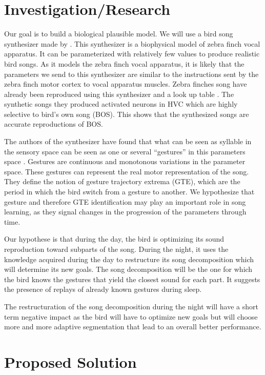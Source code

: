 \documentclass[a4paper]{article}
\begin{document}
\begin{multicols}{2}
\section*{Investigation/Research}

Our goal is to build a biological plausible model. We will use a bird song
synthesizer made by \textcite{boari_automatic_2015}. This synthesizer is a
biophysical model of zebra finch vocal apparatus. It can be parameterized with
relatively few values to produce realistic bird songs. As it models the zebra
finch vocal apparatus, it is likely that the parameters we send to this
synthesizer are similar to the instructions sent by the zebra finch motor cortex
to vocal apparatus muscles. Zebra finches song have already been reproduced
using this synthesizer and a look up table \parencite{boari_automatic_2015}. The
synthetic songs they produced activated neurons in HVC which are highly
selective to bird's own song (BOS). This shows that the synthesized songs are
accurate reproductions of BOS.

The authors of the synthesizer have found that what can be seen as syllable in
the sensory space can be seen as one or several ``gestures'' in this parameters
space \parencite{amador_low_2014, boari_automatic_2015}. Gestures are continuous
and monotonous variations in the parameter space. These gestures can represent
the real motor representation of the song. They define the notion of gesture
trajectory extrema (GTE), which are the period in which the bird switch from a
gesture to another. We hypothesize that gesture and therefore GTE identification
may play an important role in song learning, as they signal changes in the
progression of the parameters through time.

Our hypothese is that during the day, the bird is optimizing its sound
reproduction toward subparts of the song. During the night, it uses the
knowledge acquired during the day to restructure its song decomposition which
will determine its new goals. The song decomposition will be the one for which
the bird knows the gestures that yield the closest sound for each part. It
suggests the presence of replays of already known gestures during sleep.

The restructuration of the song decomposition during the night will have a short
term negative impact as the bird will have to optimize new goals but will
choose more and more adaptive segmentation that lead to an overall better
performance.

\section*{Proposed Solution}


\end{multicols}
\end{document}
